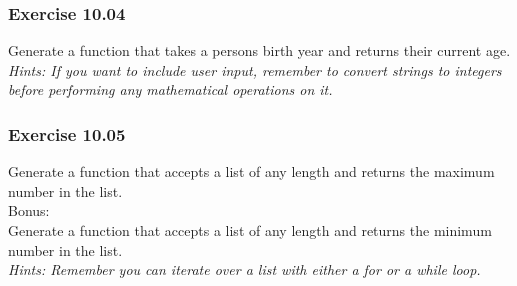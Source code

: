 \subsubsection*{Exercise 10.04}
Generate a function {} that takes a persons birth year and
returns their current age.\\

\textit{Hints:
If you want to include user input, remember to convert strings to integers before
performing any mathematical operations on it.}\\[1cm]



\subsubsection*{Exercise 10.05}
Generate a function {} that accepts a list of any length and
returns the maximum number in the list.\\
Bonus:\\
Generate a function {} that accepts a list of any length and
returns the minimum number in the list.\\

\textit{Hints:
Remember you can iterate over a list with either a for or a while loop.}

